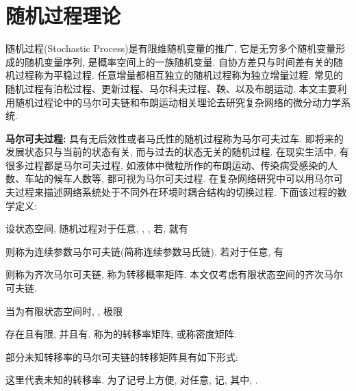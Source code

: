 \section{随机过程理论}
    随机过程(Stochastic Process)是有限维随机变量的推广, 它是无穷多个随机变量形成的随机变量序列, 是概率空间上的一族随机变量. 自协方差只与时间差有关的随机过程称为平稳过程. 任意增量都相互独立的随机过程称为独立增量过程. 常见的随机过程有泊松过程、更新过程、马尔科夫过程、鞅、以及布朗运动. 本文主要利用随机过程论中的马尔可夫链和布朗运动相关理论去研究复杂网络的微分动力学系统.

    {\bf 马尔可夫过程:} 具有无后效性或者马氏性的随机过程称为马尔可夫过车. 即将来的发展状态只与当前的状态有关, 而与过去的状态无关的随机过程. 在现实生活中, 有很多过程都是马尔可夫过程, 如液体中微粒所作的布朗运动、传染病受感染的人数、车站的候车人数等, 都可视为马尔可夫过程. 在复杂网络研究中可以用马尔可夫过程来描述网络系统处于不同外在环境时耦合结构的切换过程. 下面该过程的数学定义:
    \begin{defn}
           设状态空间, 随机过程对于任意, , , 若, 就有
           \begin{comment}
                P\{r(t_{n+1})=i_{n+1}|r(t_0)=i_0,r(t_1)=i_1,\cdots,r(t_n)=i_n\}=P\{r(t_{n+1})=i_{n+1}|r(t_n)=i_n\}
            \end{comment}
            则称为连续参数马尔可夫链(简称连续参数马氏链). 若对于任意, 有
            \begin{comment}
                P\{r(s+t)=j|r(s)=i\}=P\{r(t)=j|r(0)=i\}=p_{ij}(t).
            \end{comment}
            则称为齐次马尔可夫链, 称为转移概率矩阵. 本文仅考虑有限状态空间的齐次马尔可夫链.
    \end{defn}
    \begin{lem}{\rm{}}
            当为有限状态空间时, , 极限
            \begin{comment}
                q_{ii}\triangleq\lim_{t\rightarrow0}\frac{1-p_{ii}(t)}{t},\quad q_{ij}\triangleq p'_{ij}(0)=\lim_{t\rightarrow0}\frac{p_{ij}(t)}{t}.
            \end{comment}
            存在且有限, 并且有. 称为的转移率矩阵, 或称密度矩阵.
    \end{lem}

    部分未知转移率的马尔可夫链的转移矩阵具有如下形式:

        这里代表未知的转移率. 为了记号上方便, 对任意, 记, 其中, .

